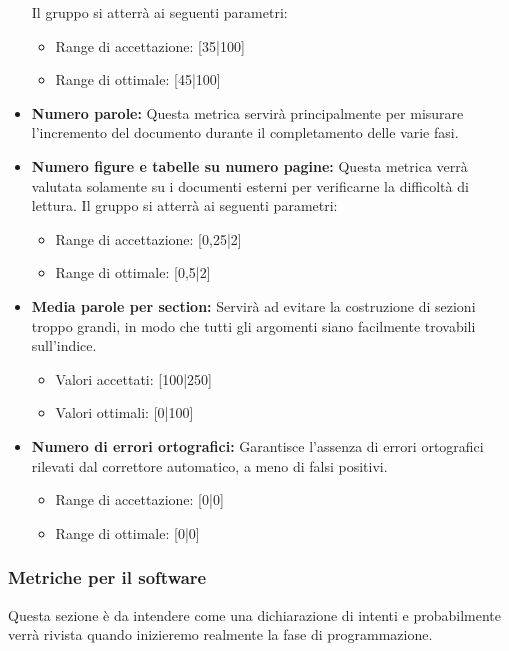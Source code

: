 \documentclass[a4paper]{article}
\begin{document}
\begin{itemize}
				Il gruppo si atterrà ai seguenti parametri:
				\begin{itemize}
					\item Range di accettazione: [35|100]
					\item Range di ottimale: [45|100]
				\end{itemize}
				\item \textbf{Numero parole:} Questa metrica servirà principalmente per misurare l'incremento del documento durante il completamento delle varie fasi.
				\item \textbf{Numero figure e tabelle su numero pagine:} Questa metrica verrà valutata solamente su i documenti esterni per verificarne la difficoltà di lettura.
				Il gruppo si atterrà ai seguenti parametri:
				\begin{itemize}
					\item Range di accettazione: [0,25|2]
					\item Range di ottimale: [0,5|2]
				\end{itemize}
				\item \textbf{Media parole per section:} Servirà ad evitare la costruzione di sezioni troppo grandi, in modo che tutti
				gli argomenti siano facilmente trovabili sull'indice.
				\begin{itemize}
					\item Valori accettati: [100|250]
					\item Valori ottimali: [0|100]
				\end{itemize}
				\item \textbf{Numero di errori ortografici:} 
				Garantisce l'assenza di errori ortografici rilevati dal correttore automatico, a meno di falsi positivi.
				\begin{itemize}
					\item Range di accettazione: [0|0]
					\item Range di ottimale: [0|0]
				\end{itemize}
			\end{itemize}
			
			\subsubsection{Metriche per il software}
				Questa sezione è da intendere come una dichiarazione di intenti e probabilmente verrà rivista quando inizieremo 
				realmente la fase di programmazione.
\end{document}
